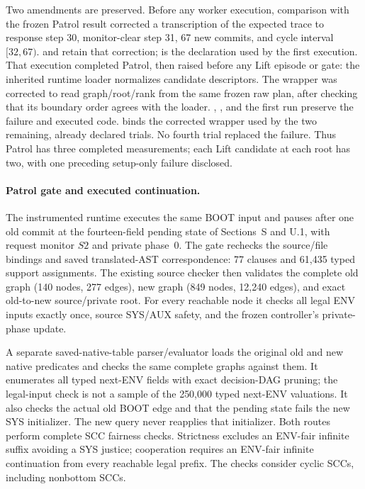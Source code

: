 Two amendments are preserved. Before any worker execution, comparison
with the frozen Patrol result corrected a transcription of the expected
trace to response step 30, monitor-clear step 31, 67 new commits, and
cycle interval $[32,67)$.
 and
 retain that correction;
 is the declaration used by the
first execution. That execution completed Patrol, then raised
 before any Lift episode or gate: the inherited
runtime loader normalizes candidate descriptors. The wrapper was
corrected to read graph/root/rank from the same frozen raw plan, after
checking that its boundary order agrees with the loader.
, , and the
first run preserve the failure and executed code.
 binds the corrected wrapper used by the two
remaining, already declared trials. No fourth trial replaced the failure.
Thus Patrol has three completed measurements; each Lift candidate at
each root has two, with one preceding setup-only failure disclosed.

\paragraph{Patrol gate and executed continuation.}
The instrumented runtime executes the same BOOT input and pauses after
one old commit at the fourteen-field pending state of Sections~S and
U.1, with request monitor $S2$ and private phase~0. The gate rechecks the
source/file bindings and saved translated-AST correspondence: 77 clauses
and 61,435 typed support assignments. The existing source checker then
validates the complete old graph (140 nodes, 277 edges), new graph
(849 nodes, 12,240 edges), and exact old-to-new source/private root.
For every reachable node it checks all legal ENV inputs exactly once,
source SYS/AUX safety, and the frozen controller's private-phase update.

A separate saved-native-table parser/evaluator loads the original old
and new native predicates and checks the same complete graphs against
them. It enumerates all typed next-ENV fields with exact decision-DAG
pruning; the legal-input check is not a sample of the 250,000 typed
next-ENV valuations. It also checks the actual old BOOT edge and that
the pending state fails the new SYS initializer. The new query never
reapplies that initializer. Both routes perform complete SCC fairness
checks. Strictness excludes an ENV-fair infinite suffix avoiding a SYS
justice; cooperation requires an ENV-fair infinite continuation from
every reachable legal prefix. The checks consider cyclic SCCs, including
nonbottom SCCs.

